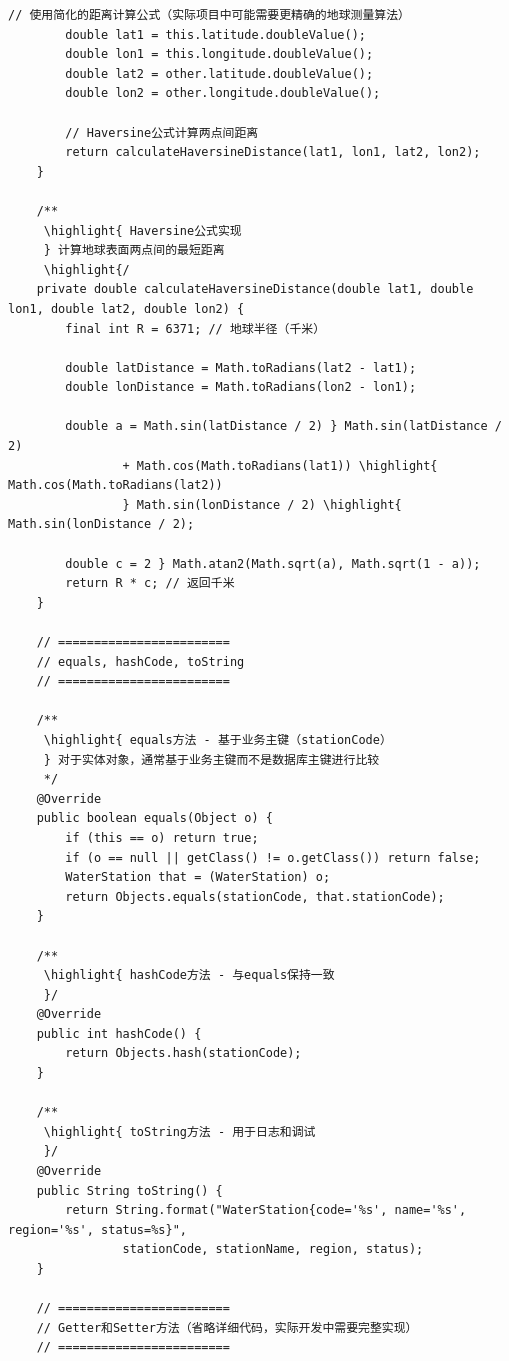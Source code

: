 \begin{lstlisting}[style=java]
        // 使用简化的距离计算公式（实际项目中可能需要更精确的地球测量算法）
        double lat1 = this.latitude.doubleValue();
        double lon1 = this.longitude.doubleValue();
        double lat2 = other.latitude.doubleValue();
        double lon2 = other.longitude.doubleValue();
        
        // Haversine公式计算两点间距离
        return calculateHaversineDistance(lat1, lon1, lat2, lon2);
    }
    
    /**
     \highlight{ Haversine公式实现
     } 计算地球表面两点间的最短距离
     \highlight{/
    private double calculateHaversineDistance(double lat1, double lon1, double lat2, double lon2) {
        final int R = 6371; // 地球半径（千米）
        
        double latDistance = Math.toRadians(lat2 - lat1);
        double lonDistance = Math.toRadians(lon2 - lon1);
        
        double a = Math.sin(latDistance / 2) } Math.sin(latDistance / 2)
                + Math.cos(Math.toRadians(lat1)) \highlight{ Math.cos(Math.toRadians(lat2))
                } Math.sin(lonDistance / 2) \highlight{ Math.sin(lonDistance / 2);
        
        double c = 2 } Math.atan2(Math.sqrt(a), Math.sqrt(1 - a));
        return R * c; // 返回千米
    }
    
    // ========================
    // equals, hashCode, toString
    // ========================
    
    /**
     \highlight{ equals方法 - 基于业务主键（stationCode）
     } 对于实体对象，通常基于业务主键而不是数据库主键进行比较
     */
    @Override
    public boolean equals(Object o) {
        if (this == o) return true;
        if (o == null || getClass() != o.getClass()) return false;
        WaterStation that = (WaterStation) o;
        return Objects.equals(stationCode, that.stationCode);
    }
    
    /**
     \highlight{ hashCode方法 - 与equals保持一致
     }/
    @Override
    public int hashCode() {
        return Objects.hash(stationCode);
    }
    
    /**
     \highlight{ toString方法 - 用于日志和调试
     }/
    @Override
    public String toString() {
        return String.format("WaterStation{code='%s', name='%s', region='%s', status=%s}",
                stationCode, stationName, region, status);
    }
    
    // ========================
    // Getter和Setter方法（省略详细代码，实际开发中需要完整实现）
    // ========================
    

\end{lstlisting}
